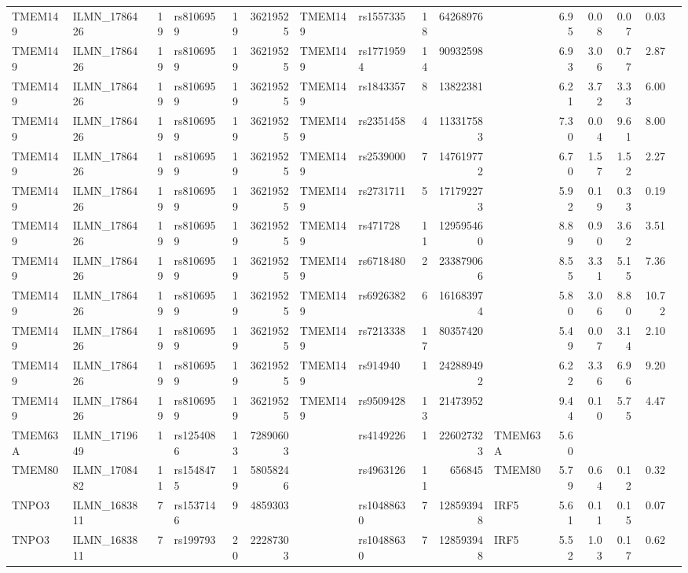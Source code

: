 \documentclass{article}
\begin{document}
\begin{landscape}
{\begin{ThreePartTable}
\begin{longtable}{|llr|lrrl|lrrl|rrrr|r|}
TMEM149 & ILMN\_1786426 & 19 & rs8106959 & 19 & 36219525 & TMEM149 & rs1557335 & 18 & 64268976 &  & 6.95 & 0.08 & 0.07 & 0.03 &  \\
TMEM149 & ILMN\_1786426 & 19 & rs8106959 & 19 & 36219525 & TMEM149 & rs17719594 & 14 & 90932598 &  & 6.93 & 3.06 & 0.77 & 2.87 &  \\
TMEM149 & ILMN\_1786426 & 19 & rs8106959 & 19 & 36219525 & TMEM149 & rs1843357 & 8 & 13822381 &  & 6.21 & 3.72 & 3.33 & 6.00 &  \\
TMEM149 & ILMN\_1786426 & 19 & rs8106959 & 19 & 36219525 & TMEM149 & rs2351458 & 4 & 113317583 &  & 7.30 & 0.04 & 9.61 & 8.00 &  \\
TMEM149 & ILMN\_1786426 & 19 & rs8106959 & 19 & 36219525 & TMEM149 & rs2539000 & 7 & 147619772 &  & 6.70 & 1.57 & 1.52 & 2.27 &  \\
TMEM149 & ILMN\_1786426 & 19 & rs8106959 & 19 & 36219525 & TMEM149 & rs2731711 & 5 & 171792273 &  & 5.92 & 0.19 & 0.33 & 0.19 &  \\
TMEM149 & ILMN\_1786426 & 19 & rs8106959 & 19 & 36219525 & TMEM149 & rs471728 & 11 & 129595460 &  & 8.89 & 0.90 & 3.62 & 3.51 &  \\
TMEM149 & ILMN\_1786426 & 19 & rs8106959 & 19 & 36219525 & TMEM149 & rs6718480 & 2 & 233879066 &  & 8.55 & 3.31 & 5.15 & 7.36 &  \\
TMEM149 & ILMN\_1786426 & 19 & rs8106959 & 19 & 36219525 & TMEM149 & rs6926382 & 6 & 161683974 &  & 5.80 & 3.06 & 8.80 & 10.72 &  \\
TMEM149 & ILMN\_1786426 & 19 & rs8106959 & 19 & 36219525 & TMEM149 & rs7213338 & 17 & 80357420 &  & 5.49 & 0.07 & 3.14 & 2.10 &  \\
TMEM149 & ILMN\_1786426 & 19 & rs8106959 & 19 & 36219525 & TMEM149 & rs914940 & 1 & 242889492 &  & 6.22 & 3.36 & 6.96 & 9.20 &  \\
TMEM149 & ILMN\_1786426 & 19 & rs8106959 & 19 & 36219525 & TMEM149 & rs9509428 & 13 & 21473952 &  & 9.44 & 0.10 & 5.75 & 4.47 &  \\
TMEM63A & ILMN\_1719649 & 1 & rs1254086 & 13 & 72890603 &  & rs4149226 & 1 & 226027323 & TMEM63A & 5.60 &  &  &  &  \\
TMEM80 & ILMN\_1708482 & 11 & rs1548475 & 19 & 58058246 &  & rs4963126 & 11 & 656845 & TMEM80 & 5.79 & 0.64 & 0.12 & 0.32 &  \\
TNPO3 & ILMN\_1683811 & 7 & rs1537146 & 9 & 4859303 &  & rs10488630 & 7 & 128593948 & IRF5 & 5.61 & 0.11 & 0.15 & 0.07 &  \\
TNPO3 & ILMN\_1683811 & 7 & rs199793 & 20 & 22287303 &  & rs10488630 & 7 & 128593948 & IRF5 & 5.52 & 1.03 & 0.17 & 0.62 &  \\

\end{longtable}
\end{ThreePartTable}}
\end{landscape}
\end{document}
